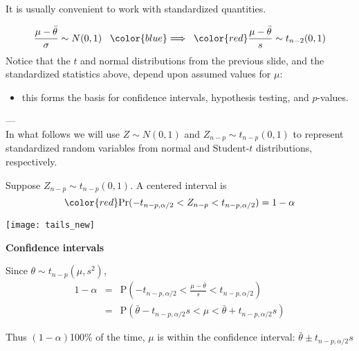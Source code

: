 \documentclass[12pt,xcolor=svgnames]{beamer}
\newcommand{\rd}{\color{red}}
\newcommand{\bl}{\color{blue}}
\newcommand{\theme}{\color{FireBrick}}
\newcommand{\mr}[1]{\mathrm{#1}}
\newcommand{\sk}{\vspace{.4cm}}
\newcommand{\nochap}{\vspace{0.5cm}}
\newcommand{\nsk}{\vspace{-.4cm}}
\newcommand{\chap}[1]{{\theme \Large \bf #1} \sk}
\begin{document}
\begin{frame}
\nochap

It is usually convenient to work with standardized quantities. 

\[
\frac{\mu - \bar{\theta}}{\sigma} \sim N(0,1) \;\;\; {\bl \Longrightarrow} \;\;\;
{\rd \frac{\mu - \bar{\theta}}{s} \sim t_{n-2}(0,1)} 
\]
Notice that the $t$ and normal distributions from the previous slide, 
and the standardized statistics above, depend upon assumed values for
$\mu$:
\begin{itemize}
\item {\bl  this forms the basis for confidence intervals,
hypothesis testing, and $p$-values.}
\end{itemize}

\sk ---\\
{\small In what follows we will use $Z \sim N(0,1)$ and $Z_{n-p} \sim
t_{n-p}(0,1)$ to represent standardized random variables from normal and
Student-$t$ distributions, respectively.}

\end{frame}


\begin{frame}
\nochap

Suppose $Z_{n-p} \sim t_{n-p}(0,1)$.  A centered interval is\\
\nsk
\[
\rd \mr{Pr}(-t_{n-p,\alpha/2} < Z_{n-p} < t_{n-p,\alpha/2}) = 1-\alpha
\]
\nsk

\begin{center}
\texttt{[image: tails\_new]}
\end{center}
\end{frame}

\begin{frame}
\chap{Confidence intervals}

\sk
Since $\theta \sim t_{n-p}(\mu, s^2)$, 
\begin{eqnarray*}
1-\alpha& = &\mr{P}\left(-t_{n-p,\alpha/2} < \frac{\mu - \bar{\theta}}{s} <
t_{n-p,\alpha/2}\right) \\
&=&
\mr{P}(\bar{\theta}-t_{n-p,\alpha/2}s < \mu <
\bar{\theta} + t_{n-p,\alpha/2}s) 
\end{eqnarray*}

\sk
{\bl Thus $(1-\alpha)${\small *100\%} of the time, $\mu$ is
within the confidence interval:} {\rd $\displaystyle
\bar{\theta} \pm t_{n-p,\alpha/2} s$}


\end{frame}
\end{document}
